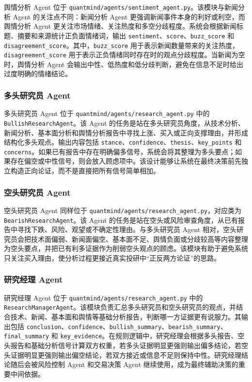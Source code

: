 \documentclass[UTF8,a4paper,12pt]{ctexart}
\begin{document}
舆情分析 Agent 位于 \texttt{quantmind/agents/sentiment\_agent.py}。该模块与新闻分析 Agent 的关注点不同：新闻分析 Agent 更强调新闻事件本身的利好或利空，而舆情分析 Agent 更关注市场情绪、关注热度和多空分歧程度。系统会根据新闻标题、摘要和来源统计正负面情绪词，输出 \texttt{sentiment}、\texttt{score}、\texttt{buzz\_score} 和 \texttt{disagreement\_score}。其中，\texttt{buzz\_score} 用于表示新闻数量带来的关注热度，\texttt{disagreement\_score} 用于表示正负情绪同时存在时的观点分歧程度。当新闻为空时，舆情分析 Agent 会输出中性、低热度和低分歧判断，避免在信息不足时给出过度明确的情绪结论。

\subsubsection{多头研究员 Agent}

多头研究员 Agent 位于 \texttt{quantmind/agents/research\_agent.py} 中的 \texttt{BullishResearchAgent}。该 Agent 的任务是站在多头研究员角度，从技术分析、新闻分析、基本面分析和舆情分析报告中寻找上涨、买入或正向支撑理由，并形成结构化多头观点。输出内容包括 \texttt{stance}、\texttt{confidence}、\texttt{thesis}、\texttt{key\_points} 和 \texttt{concerns}。如果已有报告中存在明确偏多信号，系统会将其整理为多头要点；如果存在偏空或中性信号，则会放入顾虑项中。该设计能够让系统在最终决策前先独立构造正向论证，而不是直接把所有信号简单相加。

\subsubsection{空头研究员 Agent}

空头研究员 Agent 同样位于 \texttt{quantmind/agents/research\_agent.py}，对应类为 \texttt{BearishResearchAgent}。该 Agent 的任务是站在空头或风险审查角度，从已有报告中寻找下跌、风险、观望或不确定性理由。与多头研究员 Agent 相对，空头研究员会把技术面偏弱、新闻面偏空、基本面不足、舆情负面或分歧较高等内容整理为空头要点，并把已有利多证据作为削弱空头观点的顾虑。该模块有助于避免系统只关注买入理由，使分析过程更接近真实投研中“正反两方论证”的思路。

\subsubsection{研究经理 Agent}

研究经理 Agent 位于 \texttt{quantmind/agents/research\_agent.py} 中的 \texttt{ResearchManagerAgent}。该模块负责汇总多头研究员和空头研究员的观点，并结合技术、新闻、基本面和舆情等基础分析报告，判断哪一方证据更有说服力。其输出包括 \texttt{conclusion}、\texttt{confidence}、\texttt{bullish\_summary}、\texttt{bearish\_summary}、\texttt{final\_summary} 和 \texttt{key\_evidence}。在规则逻辑中，研究经理会根据多头报告、空头报告和基础分析信号计算双方权重，若多头证据明显更强则输出偏多结论，若空头证据明显更强则输出偏空结论，若双方接近或信息不足则保持中性。研究经理结论随后会被风险控制 Agent 和交易决策 Agent 继续使用，成为最终辅助决策的重要中间依据。
\end{document}
